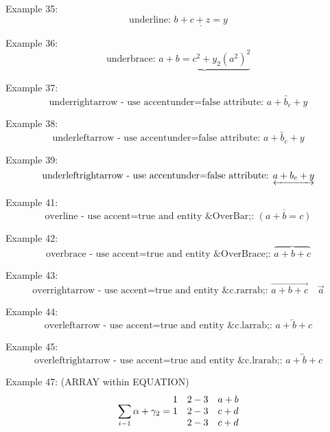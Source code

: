 \documentclass{book}
\begin{document}
\noindent Example 35:
\[\mbox{underline: }\underline{b+c+z=y}\]

\noindent Example 36:
\[\mbox{underbrace: }\underbrace{a+b=c^2 + y_2 (a^2)^2}\]

\noindent Example 37:
\[\mbox{underrightarrow - use accentunder=false attribute: }\underrightarrow{a+b_c+y}\]

\noindent Example 38:
\[\mbox{underleftarrow - use accentunder=false attribute: }\underleftarrow{a+b_c+y}\]

\noindent Example 39:
\[\mbox{underleftrightarrow - use accentunder=false attribute: }\underleftrightarrow{a+b_c+y}\]


\noindent Example 41:
\[\mbox{overline - use accent=true and entity \&OverBar;: }\overline{(a+b=c)}\]

\noindent Example 42:
\[\mbox{overbrace - use accent=true and entity \&OverBrace;: }\overbrace{a+b+c}\]

\noindent Example 43:
\[\mbox{overrightarrow - use accent=true and entity \&c.rarrab;: }\overrightarrow{a+b+c}\quad \vec{a} \]

\noindent Example 44:
\[\mbox{overleftarrow - use accent=true and entity \&c.larrab;: }\overleftarrow{a + b + c}\]

\noindent Example 45:
\[\mbox{overleftrightarrow - use accent=true and entity \&c.lrarab;: } \overleftrightarrow{a + b + c}\]


\noindent Example 47: (ARRAY within EQUATION)
\begin{equation}
\sum_{i-1}\alpha + \gamma_{2} = \begin{array}{@{}ccc@{}}
1 &2-3 &a+b\\ 
1 &2-3 &c+d\\
  &2-3 &c+d
\end{array}
\end{equation}
\end{document}
